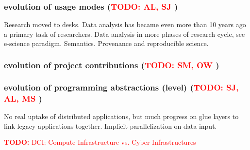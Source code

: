 \documentclass[]{article}
\newcommand{\B}[1]{\textbf{#1}}
\newcommand{\todo}[1]{{\textcolor{red}{\B{TODO:} #1 }}}
\begin{document}
 \subsubsection{ evolution of usage modes (\todo{AL, SJ})}
 
 Research moved to desks. Data analysis has became even more than 10
 years ago a primary task of researchers.  Data analysis in more
 phases of research cycle, see e-science paradigm.  Semantics.
 Provenance and reproducible science.
  
 \subsubsection{ evolution of project contributions (\todo{SM, OW})}
 
 \subsubsection{ evolution of programming abstractions (level) (\todo{SJ, AL, MS})}
 
 No real uptake of distributed applications, but much progress on glue
 layers to link legacy applications together.  Implicit
 parallelization on data input.


\newpage

\todo{DCI: Compute Infrastructure vs. Cyber Infrastructures}

\footnotesize


\end{document}
